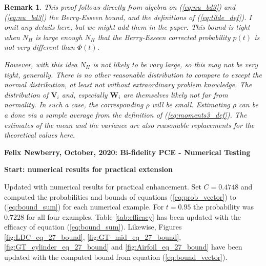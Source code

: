 \documentclass{report}
\newtheorem{remark}{Remark}[section]
\begin{document}
\begin{remark}
 This proof follows directly from algebra on (\ref{eq:nu_bd3}) and (\ref{eq:nu_bd3}) the Berry-Esseen bound, and the definitions of (\ref{eq:tilde_def}). I omit any details here, but we might add them in the paper. This bound is tight when $N_H$ is large enough $N_H$ that the Berry-Esseen corrected probability $p(t)$ is not very different than $\Phi(t)$.
 
 However, with this idea $N_H$ is not likely to be vary large, so this may not be very tight, generally. There is no other reasonable distribution to compare to except the normal distribution, at least not without extraordinary problem knowledge. The distribution of $\bm{V}_i$ and, especially $\bm{W}_i$ are themselves likely not far from normality. In such a case, the corresponding $\rho$ will be small. Estimating $\rho$ can be a done via a sample average from the definition of (\ref{eq:moments3_def}). The estimates of the mean and the variance are also reasonable replacements for the theoretical values here.
\end{remark}
\newpage

\begin{center}
\bf{Felix Newberry, October, 2020: Bi-fidelity PCE - Numerical Testing}
\end{center}

\begin{center}
\bf{Start: numerical results for practical extension}
\end{center}

Updated with numerical results for practical enhancement. Set $C=0.4748$ and computed the probabilities and bounds of equations (\ref{eq:prob_vector}) to (\ref{eq:bound_sum}) for each numerical example. For $t=0.95$ the probability was $0.7228$ for all four examples.  Table \ref{tab:efficacy} has been updated with the efficacy of equation (\ref{eq:bound_sum}). Likewise, Figures \ref{fig:LDC_eq_27_bound}, \ref{fig:GT_mid_eq_27_bound}, \ref{fig:GT_cylinder_eq_27_bound} and \ref{fig:Airfoil_eq_27_bound} have been updated with the computed bound from equation (\ref{eq:bound_vector}). \\
\end{document}
